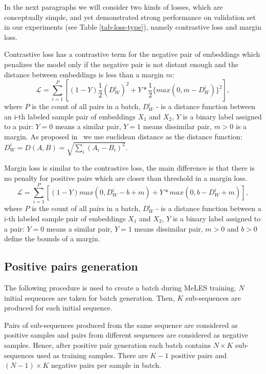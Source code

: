 \documentclass{article}
\begin{document}
In the next paragraphs we will consider two kinds of losses, which are conceptually simple, and yet demonstrated strong performance on validation set in our experiments (see Table \ref{tab-loss-type}), namely contrastive loss and margin loss.

Contrastive loss has a contrastive term for the negative pair of embeddings which penalizes the model only if the negative pair is not distant enough and the distance between embeddings is less than a margin $m$:  
\begin{equation}
 \mathcal{L} = \sum_{i=1}^P \left[ (1-Y)\frac{1}{2}(D_W^i)^2 +Y*\frac{1}{2}\{max(0,m-D_W^i)\}^2 \right],
\end{equation}
where $P$ is the count of all pairs in a batch, $D_W^i$ - is a distance function between an i-th labeled sample pair of embeddings $X_1$ and $X_2$, 
$Y$ is a binary label assigned to a pair: $Y = 0$ means a similar pair, $Y = 1$ means dissimilar pair, $m > 0$ is a margin.
As proposed in~\cite{Hadsell2006DimensionalityRB} we use euclidean distance as the distance function: $D_W^i = D(A,B) = \sqrt{\sum_i(A_i - B_i)^2}$.

Margin loss is similar to the contrastive loss, the main difference is that there is no penalty for positive pairs which are closer than threshold in a margin loss.
\begin{equation}
 \mathcal{L} = \sum_{i=1}^P \left[ (1-Y)max(0, D_W^i - b + m) + Y*max(0, b-D_W^i + m) \right],
\end{equation}
where $P$ is the count of all pairs in a batch, $D_W^i$ - is a distance function between a i-th labeled sample pair of embeddings $X_1$ and $X_2$,
$Y$ is a binary label assigned to a pair: $Y = 0$ means a similar pair, $Y = 1$ means dissimilar pair, $m > 0$ and $b > 0$ define the bounds of a margin.

\subsection{Positive pairs generation} \label{sec-pos-pairs}

The following procedure is used to create a batch during MeLES training. $N$ initial sequences are taken for batch generation. Then, $K$ sub-sequences are produced for each initial sequence.

Pairs of sub-sequences produced from the same sequence are considered as positive samples and pairs from different sequences are considered as negative samples. Hence, after positive pair generation each batch contains $N \times K$ sub-sequences used as training samples. There are $K-1$ positive pairs and $(N - 1) \times K$ negative pairs per sample in batch.
\end{document}
